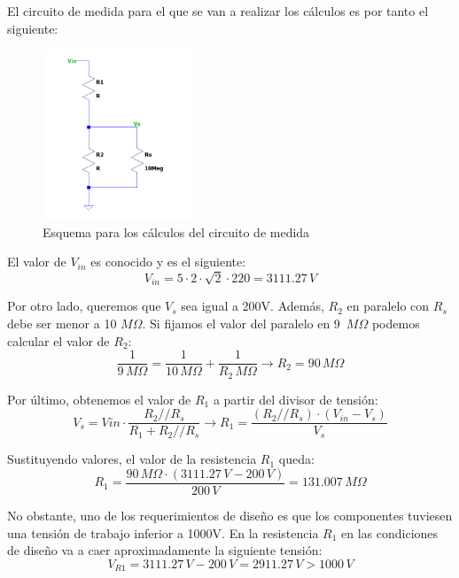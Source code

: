 El circuito de medida para el que se van a realizar los cálculos es por tanto el siguiente:
\begin{figure}[H]
    \centering
    \includegraphics[width=0.4\textwidth]{img/circ_medida.png}
    \caption{Esquema para los cálculos del circuito de medida}
    \label{fig:esquema_med}
\end{figure}

El valor de $V_{in}$ es conocido y es el siguiente:
\begin{equation}
    V_{in} = 5\cdot2\cdot\sqrt{2}\cdot220 = 3111.27\,V
\end{equation}

Por otro lado, queremos que $V_s$ sea igual a 200V. Además, $R_2$ en paralelo con $R_s$ debe 
ser menor a 10 $M\Omega$. Si fijamos el valor del paralelo en 9 $\,M\Omega$ podemos calcular 
el valor de $R_2$:
\begin{equation}
    \frac{1}{9\,M\Omega} = \frac{1}{10\,M\Omega} +\frac{1}{R_2\,M\Omega} \rightarrow R_2 = 90\,M\Omega
\end{equation}

Por último, obtenemos el valor de $R_1$ a partir del divisor de tensión:
\begin{equation}
    V_s = Vin\cdot\frac{R_2//R_s}{R_1+R_2//R_s} \rightarrow R_1 = \frac{(R_2//R_s)\cdot(V_{in}-V_s)}{V_s}
\end{equation}

Sustituyendo valores, el valor de la resistencia $R_1$ queda:
\begin{equation}
    R_1 = \frac{90\,M\Omega\cdot(3111.27\,V-200\,V)}{200\,V} = 131.007\,M\Omega
\end{equation}

No obstante, uno de los requerimientos de diseño es que los componentes tuviesen una tensión de trabajo 
inferior a 1000V. En la resistencia $R_1$ en las condiciones de diseño va a caer aproximadamente la siguiente tensión:
\begin{equation}
    V_{R1} = 3111.27\,V-200\,V = 2911.27\,V > 1000\,V
\end{equation}

